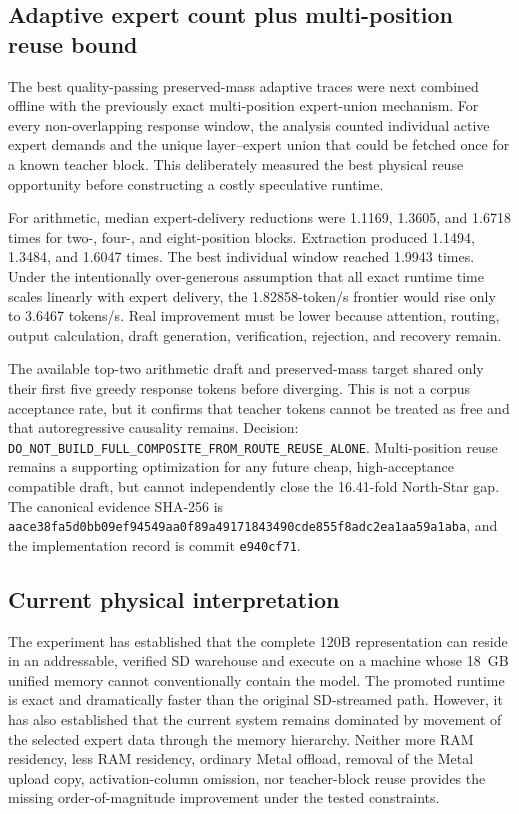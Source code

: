\subsection{Adaptive expert count plus multi-position reuse bound}

The best quality-passing preserved-mass adaptive traces were next combined
offline with the previously exact multi-position expert-union mechanism.  For
every non-overlapping response window, the analysis counted individual active
expert demands and the unique layer--expert union that could be fetched once
for a known teacher block.  This deliberately measured the best physical reuse
opportunity before constructing a costly speculative runtime.

For arithmetic, median expert-delivery reductions were 1.1169, 1.3605, and
1.6718 times for two-, four-, and eight-position blocks.  Extraction produced
1.1494, 1.3484, and 1.6047 times.  The best individual window reached 1.9943
times.  Under the intentionally over-generous assumption that all exact runtime
time scales linearly with expert delivery, the 1.82858-token/s frontier would
rise only to 3.6467 tokens/s.  Real improvement must be lower because attention,
routing, output calculation, draft generation, verification, rejection, and
recovery remain.

The available top-two arithmetic draft and preserved-mass target shared only
their first five greedy response tokens before diverging.  This is not a corpus
acceptance rate, but it confirms that teacher tokens cannot be treated as free
and that autoregressive causality remains.  Decision:
\texttt{DO\_NOT\_BUILD\_FULL\_COMPOSITE\_FROM\_ROUTE\_REUSE\_ALONE}.
Multi-position reuse remains a supporting optimization for any future cheap,
high-acceptance compatible draft, but cannot independently close the 16.41-fold
North-Star gap.  The canonical evidence SHA-256 is
\texttt{aace38fa5d0bb09ef94549aa0f89a49171843490cde855f8adc2ea1aa59a1aba},
and the implementation record is commit \texttt{e940cf71}.

\subsection{Current physical interpretation}

The experiment has established that the complete 120B representation can
reside in an addressable, verified SD warehouse and execute on a machine whose
18~GB unified memory cannot conventionally contain the model.  The promoted
runtime is exact and dramatically faster than the original SD-streamed path.
However, it has also established that the current system remains dominated by
movement of the selected expert data through the memory hierarchy.  Neither
more RAM residency, less RAM residency, ordinary Metal offload, removal of the
Metal upload copy, activation-column omission, nor teacher-block reuse provides
the missing order-of-magnitude improvement under the tested constraints.

